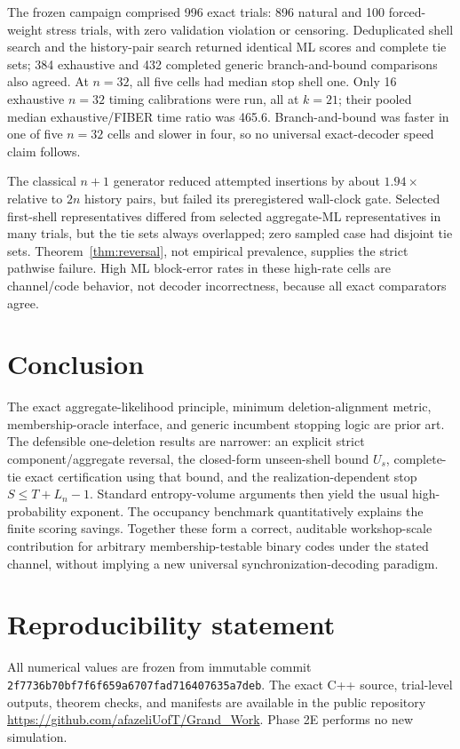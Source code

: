 \documentclass[conference]{IEEEtran}
\begin{document}
The frozen campaign comprised 996 exact trials: 896 natural and 100 forced-weight stress trials,
with zero validation violation or censoring. Deduplicated shell search and the history-pair search
returned identical ML scores and complete tie sets; 384 exhaustive and 432 completed generic
branch-and-bound comparisons also agreed. At $n=32$, all five cells had median stop shell one.
Only 16 exhaustive $n=32$ timing calibrations were run, all at $k=21$; their pooled median
exhaustive/FIBER time ratio was 465.6. Branch-and-bound was faster in one of five $n=32$ cells and
slower in four, so no universal exact-decoder speed claim follows.

The classical $n+1$ generator reduced attempted insertions by about $1.94\times$ relative to $2n$
history pairs, but failed its preregistered wall-clock gate. Selected first-shell representatives
differed from selected aggregate-ML representatives in many trials, but the tie sets always
overlapped; zero sampled case had disjoint tie sets. Theorem~\ref{thm:reversal}, not empirical
prevalence, supplies the strict pathwise failure. High ML block-error rates in these high-rate cells
are channel/code behavior, not decoder incorrectness, because all exact comparators agree.

\section{Conclusion}
The exact aggregate-likelihood principle, minimum deletion-alignment metric, membership-oracle
interface, and generic incumbent stopping logic are prior art. The defensible one-deletion results
are narrower: an explicit strict component/aggregate reversal, the closed-form unseen-shell bound
$U_s$, complete-tie exact certification using that bound, and the realization-dependent stop
$S\le T+L_n-1$. Standard entropy-volume arguments then yield the usual high-probability exponent.
The occupancy benchmark quantitatively explains the finite scoring savings. Together these form a
correct, auditable workshop-scale contribution for arbitrary membership-testable binary codes under
the stated channel, without implying a new universal synchronization-decoding paradigm.

\section*{Reproducibility statement}
All numerical values are frozen from immutable commit
\texttt{2f7736b70bf7f6f659a6707fad716407635a7deb}. The exact C++ source, trial-level outputs,
theorem checks, and manifests are available in the public repository
\url{https://github.com/afazeliUofT/Grand_Work}. Phase 2E performs no new simulation.
\end{document}
